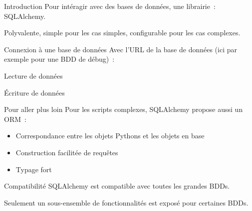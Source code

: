 \begin{frame}{Introduction}
  Pour intéragir avec des bases de données, une librairie~: SQLAlchemy.

  Polyvalente, simple pour les cas simples, configurable pour les cas complexes.
\end{frame}

\begin{frame}{Connexion à une base de données}
  Avec l'URL de la base de données (ici par exemple pour une BDD de débug)~:

\end{frame}

\begin{frame}{Lecture de données}
\end{frame}

\begin{frame}{Écriture de données}
\end{frame}

\begin{frame}{Pour aller plus loin}
  Pour les scripts complexes, SQLAlchemy propose aussi un ORM~:

  \begin{itemize}[<+->]
    \item Correspondance entre les objets Pythons et les objets en base
    \item Construction facilitée de requêtes
    \item Typage fort
  \end{itemize}
\end{frame}

\begin{frame}{Compatibilité}
  SQLAlchemy est compatible avec toutes les grandes BDDs.

  Seulement un sous-ensemble de fonctionnalités est exposé pour certaines BDDs.
\end{frame}
